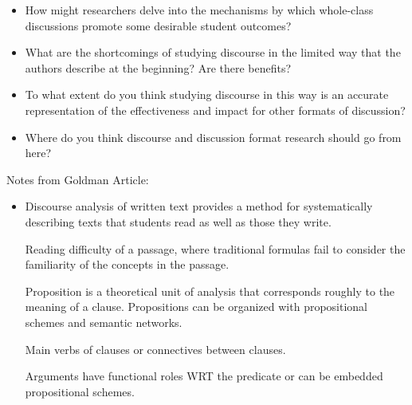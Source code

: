 \documentclass{TC}
\begin{document}
\begin{itemize}
\begin{itemize}
\begin{itemize}
		\end{itemize}
	\item How might researchers delve into the mechanisms by which whole-class discussions promote some desirable student outcomes?
	\item What are the shortcomings of studying discourse in the limited way that the authors describe at the beginning? Are there benefits?
	\item To what extent do you think studying discourse in this way is an accurate representation of the effectiveness and impact for other formats of discussion?
	\item Where do you think discourse and discussion format research should go from here?
	\end{itemize}
\end{itemize}





Notes from Goldman Article:
\begin{itemize}
\item Discourse analysis of written text provides a method for systematically describing texts that students read as well as those they write. 

	
\begin{definition}[Readability]
	Reading difficulty of a passage, where traditional formulas fail to consider the familiarity of the concepts in the passage.
\end{definition}
\begin{definition}
	Proposition is a theoretical unit of analysis that corresponds roughly to the meaning of a clause.  Propositions can be organized with propositional schemes and semantic networks.
\end{definition}

\begin{definition}
Main verbs of clauses or connectives between clauses.
\end{definition}

\begin{definition}
Arguments have functional roles WRT the predicate or can be embedded propositional schemes.
\end{definition}
\end{itemize}
\end{document}
